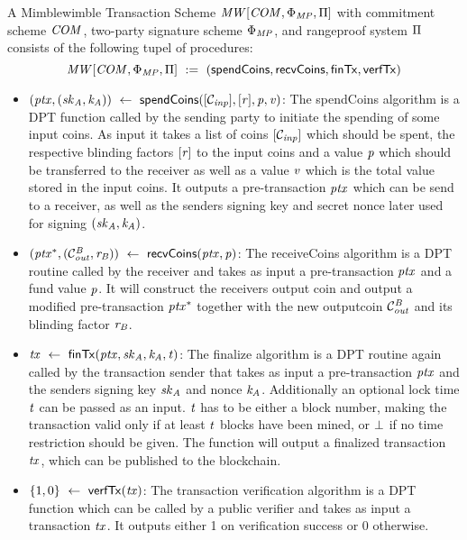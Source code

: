 \begin{definition}
    \label{def:mw-tx-scheme}
    A Mimblewimble Transaction Scheme $\mathit{MW}[\mathit{COM},\Phi_{\mathit{MP}},\Pi]$ with commitment scheme $\mathit{COM}$, two-party signature scheme $\Phi_{\mathit{MP}}$, and rangeproof system $\Pi$ consists of the following tupel of procedures:
    \[ \mathit{MW}[\mathit{COM},\Phi_{\mathit{MP}},\Pi] ~:=~ ( \mathsf{spendCoins},\mathsf{recvCoins},\mathsf{finTx},\mathsf{verfTx} ) \]
    \begin{itemize}
        \item $(\mathit{ptx}, (\mathit{sk}_{\mathit{A}}, \mathit{\mathit{k}_{\mathit{A}}})) ~\leftarrow~ \mathsf{spendCoins}([\mathcal{C}_{\mathit{inp}}],[\mathit{r}],\mathit{p},\mathit{v})$: The spendCoins algorithm is a DPT function called by the sending party to
        initiate the spending of some input coins. As input it takes a list of coins $[\mathcal{C}_{\mathit{inp}}]$ which should be spent, the respective blinding factors $[\mathit{r}]$ to the input coins and a value $\mathit{p}$ which should be
        transferred to the receiver as well as a value $\mathit{v}$ which is the total value stored in the input coins. It outputs a pre-transaction $\mathit{ptx}$ which can be send to a receiver, as well as the senders signing key and secret nonce later used for signing $(\mathit{sk}_{\mathit{A}}, \mathit{\mathit{k}_{\mathit{A}}})$.
        \item $(\mathit{ptx}^*, (\mathcal{C}_{\mathit{out}}^{\mathit{B}}, \mathit{r}_{\mathit{B}})) ~\leftarrow~ \mathsf{recvCoins}(\mathit{ptx},\mathit{p})$: The receiveCoins algorithm is a DPT routine called by the receiver and takes as input a pre-transaction $\mathit{ptx}$ and a fund value
        $\mathit{p}$. It will construct the receivers output coin and output a modified pre-transaction $\mathit{ptx}^*$ together with the new outputcoin $\mathcal{C}_{\mathit{out}}^{\mathit{B}}$ and its blinding factor $\mathit{r}_{\mathit{B}}$.
        \item $\mathit{tx} ~\leftarrow~ \mathsf{finTx}(\mathit{ptx},\mathit{sk}_{\mathit{A}},\mathit{\mathit{k}_{\mathit{A}}},\mathit{t})$: The finalize algorithm is a DPT routine again called by the transaction sender that takes as input a pre-transaction $\mathit{ptx}$ and the senders
        signing key $\mathit{sk}_{\mathit{A}}$ and nonce $\mathit{\mathit{k}_{\mathit{A}}}$.
        Additionally an optional lock time $\mathit{t}$ can be passed as an input.
        $\mathit{t}$ has to be either a block number, making the transaction valid only if at least $\mathit{t}$ blocks have been mined, or $\bot$ if no time restriction should be given.
        The function will output a finalized transaction $\mathit{tx}$, which can be published to the blockchain.
        \item $\{1,0\} ~\leftarrow~ \mathsf{verfTx}(\mathit{tx})$: The transaction verification algorithm is a DPT function which can be called by a public verifier and takes as input a transaction $\mathit{tx}$. It
        outputs either 1 on verification success or 0 otherwise.
    \end{itemize}
\end{definition}

